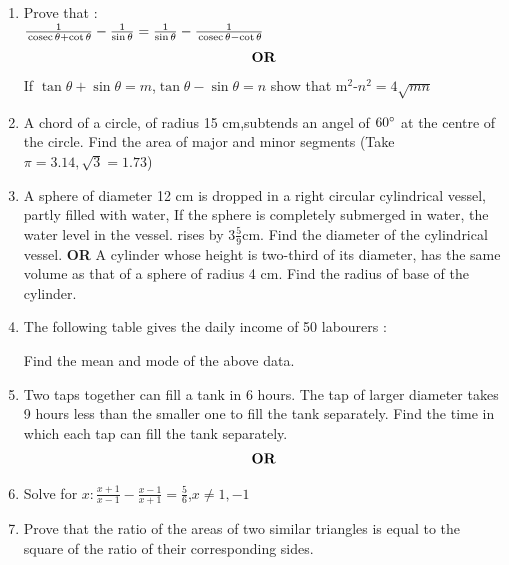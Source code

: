 \documentclass[journal,12pt,twocolumn]{IEEEtran}
\renewcommand\thesection{\arabic{section}}
\begin{document}
\begin{enumerate}[label=\thesection.\arabic*.,ref=\thesection.\theenumi]
\item Prove that : \\ $\frac{1}{\,\text{cosec}\,\theta + \cot\theta}-\frac{1}{\sin\theta}=\frac{1}{\sin\theta}-\frac{1}{\,\text{cosec}\,\theta-\cot\theta}$
\begin{align}
    \centering \vec{OR}\nonumber
\end{align}
If $\tan\theta + \sin\theta = m$,$\tan\theta-\sin\theta=n$ show that m$^2$-$n^2=4\sqrt{mn}$
\item A chord of a circle, of radius 15 cm,subtends an angel of $60\degree$ at the centre of the circle. Find the area of major and minor segments (Take $\pi=3.14, \sqrt{3}=1.73$)
\item A sphere of diameter 12 cm is dropped in a right circular cylindrical vessel, partly filled with water, If the sphere is completely submerged in water, the water level in the vessel. rises by $3\frac{5}{9}$cm. Find the diameter of the cylindrical vessel.
\newline \textbf{OR} \newline
A cylinder whose height is two-third of its diameter, has the same volume as that of a sphere of radius 4 cm. Find the radius of base of the cylinder.
\item The following table gives the daily income of 50 labourers :\\
\begin{table}[htb]
	\centering
Find the mean and mode of the above data.\\
\end{table}
\item Two taps together can fill a tank in 6 hours. The tap of larger diameter takes 9 hours  less than the smaller one to fill the tank separately. Find the time in which each tap can fill the tank separately.
\begin{align}
    \centering \vec{OR}\nonumber
\end{align}
\item Solve for $x : \frac{x+1}{x-1}-\frac{x-1}{x+1}=\frac{5}{6}$,$x\neq1,-1$\\
\item Prove that the ratio of the areas of two similar triangles is equal to the square of the ratio of their corresponding sides.

\end{enumerate}
\end{document}

